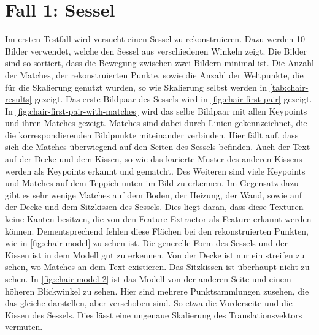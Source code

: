 \section{Fall 1: Sessel}
\label{sec:testcase-chair}
Im ersten Testfall wird versucht einen Sessel zu rekonstruieren.
Dazu werden 10 Bilder verwendet, welche den Sessel aus verschiedenen Winkeln zeigt.
Die Bilder sind so sortiert, dass die Bewegung zwischen zwei Bildern minimal ist.
Die Anzahl der Matches, der rekonstruierten Punkte, sowie die Anzahl der Weltpunkte, die für die Skalierung genutzt wurden, so wie Skalierung selbst werden in \cref{tab:chair-results} gezeigt. %
Das erste Bildpaar des Sessels wird in \cref{fig:chair-first-pair} gezeigt.
In \cref{fig:chair-first-pair-with-matches} wird das selbe Bildpaar mit allen Keypoints und ihren Matches gezeigt.
Matches sind dabei durch Linien gekennzeichnet, die die korrespondierenden Bildpunkte miteinander verbinden.
Hier fällt auf, dass sich die Matches überwiegend auf den Seiten des Sessels befinden.
Auch der Text auf der Decke und dem Kissen, so wie das karierte Muster des anderen Kissens werden als Keypoints erkannt und gematcht. %
Des Weiteren sind viele Keypoints und Matches auf dem Teppich unten im Bild zu erkennen.
Im Gegensatz dazu gibt es sehr wenige Matches auf dem Boden, der Heizung, der Wand, sowie auf der Decke und dem Sitzkissen des Sessels.
Dies liegt daran, dass diese Texturen keine Kanten besitzen, die von den Feature Extractor als Feature erkannt werden können.
Dementsprechend fehlen diese Flächen bei den rekonstruierten Punkten, wie in \cref{fig:chair-model} zu sehen ist.  
Die generelle Form des Sessels und der Kissen ist in dem Modell gut zu erkennen.
Von der Decke ist nur ein streifen zu sehen, wo Matches an dem Text existieren.  
Das Sitzkissen ist überhaupt nicht zu sehen.
In \cref{fig:chair-model-2} ist das Modell von der anderen Seite und einem höheren Blickwinkel zu sehen.
Hier sind mehrere Punktsammlungen zusehen, die das gleiche darstellen, aber verschoben sind.
So etwa die Vorderseite und die Kissen des Sessels.
Dies lässt eine ungenaue Skalierung des Translationsvektors vermuten.

